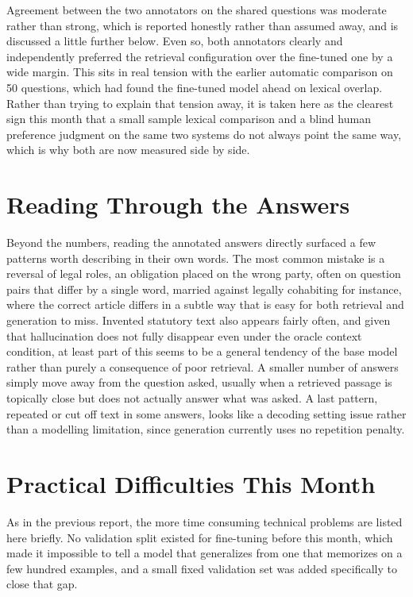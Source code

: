 \documentclass[11pt, a4paper]{article}
\begin{document}
Agreement between the two annotators on the shared questions was moderate rather than strong, which is reported honestly rather than assumed away, and is discussed a little further below. Even so, both annotators clearly and independently preferred the retrieval configuration over the fine-tuned one by a wide margin. This sits in real tension with the earlier automatic comparison on 50 questions, which had found the fine-tuned model ahead on lexical overlap. Rather than trying to explain that tension away, it is taken here as the clearest sign this month that a small sample lexical comparison and a blind human preference judgment on the same two systems do not always point the same way, which is why both are now measured side by side.

\section{Reading Through the Answers}

Beyond the numbers, reading the annotated answers directly surfaced a few patterns worth describing in their own words. The most common mistake is a reversal of legal roles, an obligation placed on the wrong party, often on question pairs that differ by a single word, married against legally cohabiting for instance, where the correct article differs in a subtle way that is easy for both retrieval and generation to miss. Invented statutory text also appears fairly often, and given that hallucination does not fully disappear even under the oracle context condition, at least part of this seems to be a general tendency of the base model rather than purely a consequence of poor retrieval. A smaller number of answers simply move away from the question asked, usually when a retrieved passage is topically close but does not actually answer what was asked. A last pattern, repeated or cut off text in some answers, looks like a decoding setting issue rather than a modelling limitation, since generation currently uses no repetition penalty.

\section{Practical Difficulties This Month}

As in the previous report, the more time consuming technical problems are listed here briefly. No validation split existed for fine-tuning before this month, which made it impossible to tell a model that generalizes from one that memorizes on a few hundred examples, and a small fixed validation set was added specifically to close that gap.
\end{document}

